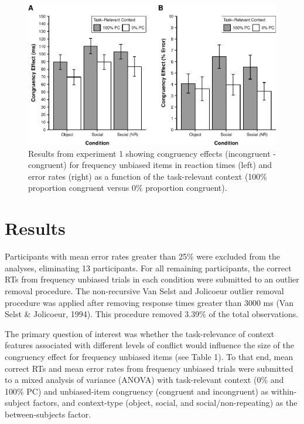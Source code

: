 \documentclass[english,,man,floatsintext]{apa6}
\begin{document}
\begin{figure}
\centering
\includegraphics{manuscript_files/figure-latex/figure2-1.pdf}
\caption{\label{fig:figure2}Results from experiment 1 showing congruency effects
(incongruent - congruent) for frequency unbiased items in reaction times
(left) and error rates (right) as a function of the task-relevant
context (100\% proportion congruent versus 0\% proportion congruent).}
\end{figure}






\section{Results}\label{results}

Participants with mean error rates greater than 25\% were excluded from
the analyses, eliminating 13 participants. For all remaining
participants, the correct RTs from frequency unbiased trials in each
condition were submitted to an outlier removal procedure. The
non-recursive Van Selst and Jolicoeur outlier removal procedure was
applied after removing response times greater than 3000 ms (Van Selst \&
Jolicoeur, 1994). This procedure removed 3.39\% of the total
observations.

The primary question of interest was whether the task-relevance of
context features associated with different levels of conflict would
influence the size of the congruency effect for frequency unbiased items
(see Table 1). To that end, mean correct RTs and mean error rates from
frequency unbiased trials were submitted to a mixed analysis of variance
(ANOVA) with task-relevant context (0\% and 100\% PC) and unbiased-item
congruency (congruent and incongruent) as within-subject factors, and
context-type (object, social, and social/non-repeating) as the
between-subjects factor.
\end{document}
